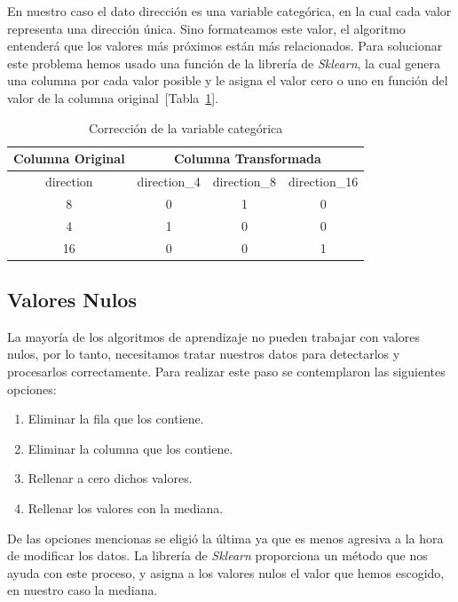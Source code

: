 En nuestro caso el dato dirección es una variable categórica, en la cual cada valor representa una dirección única. Sino formateamos este valor, el algoritmo entenderá que los valores más próximos están más relacionados.
Para solucionar este problema hemos usado una función de la librería de \textit{Sklearn}, la cual genera una columna por cada valor posible y le asigna el valor cero o uno en función del valor de la columna original~[Tabla~\ref{tab:categorical_feature}].

\begin{table}[H]
    \centering
    \begin{tabular}{ c || c c c }
\toprule
\textbf{Columna Original} & \multicolumn{3}{c}{\textbf{Columna Transformada}} \\
\midrule
direction &  direction\_4 &  direction\_8 &  direction\_16 \\
\midrule
8  &             0 &            1 &             0 \\
4  &             1 &            0 &             0 \\
16 &             0 &            0 &             1 \\
\bottomrule
\end{tabular}
    \caption{Corrección de la variable categórica}
    \label{tab:categorical_feature}
\end{table}

\subsection{Valores Nulos}

La mayoría de los algoritmos de aprendizaje no pueden trabajar con valores nulos, por lo tanto, necesitamos tratar nuestros datos para detectarlos y procesarlos correctamente. 
Para realizar este paso se contemplaron las siguientes opciones:

\begin{enumerate}
    \item Eliminar la fila que los contiene.
    \item Eliminar la columna que los contiene.
    \item Rellenar a cero dichos valores.
    \item Rellenar los valores con la mediana.
\end{enumerate}

De las opciones mencionas se eligió la última ya que es menos agresiva a la hora de modificar los datos. La librería de \textit{Sklearn} proporciona un método que nos ayuda con este proceso, y asigna a los valores nulos el valor que hemos escogido, en nuestro caso la mediana.

